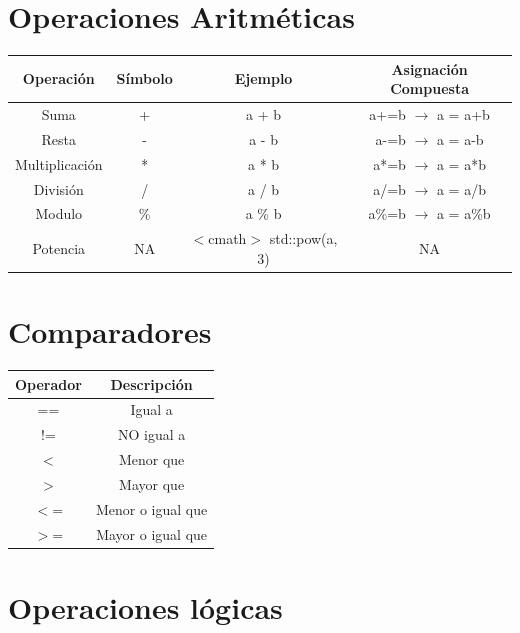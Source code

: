 \documentclass[a4paper,11pt]{article}
\begin{document}
\section*{Operaciones Aritméticas}
\begin{center}
    \begin{tabular}{| c | c | c | c |}
        \hline
        Operación & Símbolo & Ejemplo & Asignación Compuesta \\
        \hline\hline
        Suma & + & a + b & a+=b $\rightarrow$  a = a+b\\
        \hline
        Resta & - & a - b & a-=b $\rightarrow$ a = a-b\\
        \hline
        Multiplicación & * &  a * b & a*=b $\rightarrow$ a = a*b\\
        \hline
        División & / & a / b & a/=b $\rightarrow$ a = a/b\\
        \hline
        Modulo & \% & a \% b & a\%=b $\rightarrow$ a = a\%b\\
        \hline
        Potencia & NA &$<$cmath$>$ std::pow(a, 3) & NA \\
        \hline
    \end{tabular}
\end{center}

\section*{Comparadores}
\begin{center}
    \begin{tabular}{| c | c |}
        \hline
        Operador & Descripción \\
        \hline\hline
        == & Igual a \\
        \hline
        != & NO igual a \\
        \hline
        $<$ & Menor que \\
        \hline
        $>$ & Mayor que \\
        \hline
        $<$= & Menor o igual que \\
        \hline
        $>$= & Mayor o igual que \\
        \hline
    \end{tabular}
\end{center}

\section*{Operaciones lógicas}
\begin{center}
    \begin{tabular}{| c | c | c |}
    
    \end{tabular}
\end{center}
\end{document}
